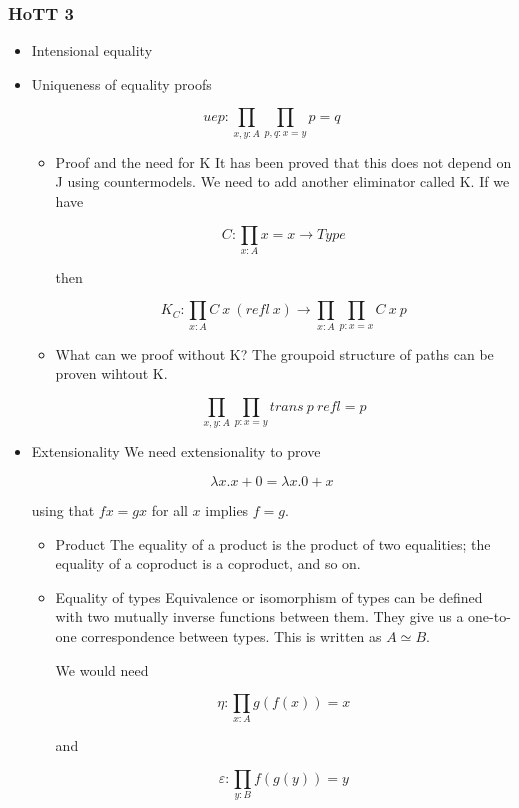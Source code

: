 \documentclass[11pt]{article}
\begin{document}
\subsubsection*{HoTT 3}
\label{sec-9-3-3}
\begin{itemize}
\item Intensional equality
\label{sec-9-3-3-1}
\item Uniqueness of equality proofs
\label{sec-9-3-3-2}

\[
uep : \prod_{x,y:A}\prod_{p,q: x=y} p=q
\]

\begin{itemize}
\item Proof and the need for K
\label{sec-9-3-3-2-1}
It has been proved that this does not depend on J using
countermodels. We need to add another eliminator called K.
If we have

\[
C : \prod_{x:A} x =x \to Type
\]

then

\[
K_C : \prod_{x:A} C\ x\ (refl\ x) \to \prod_{x:A}\prod_{p:x=x} C\ x\ p
\]

\item What can we proof without K?
\label{sec-9-3-3-2-2}
The groupoid structure of paths can be proven wihtout K.

\[
\prod_{x,y:A}\prod_{p : x=y}
trans\ p\ refl = p
\]
\end{itemize}

\item Extensionality
\label{sec-9-3-3-3}
We need extensionality to prove

\[
\lambda x. x+0 = \lambda x.0+x
\]

using that $f x = g x$ for all $x$ implies $f = g$.

\begin{itemize}
\item Product
\label{sec-9-3-3-3-1}
The equality of a product is the product of two equalities;
the equality of a coproduct is a coproduct, and so on.

\item Equality of types
\label{sec-9-3-3-3-2}
Equivalence or isomorphism of types can be defined with two
mutually inverse functions between them. They give us a one-to-one
correspondence between types. This is written as $A \simeq B$.

We would need

\[
\eta : \prod_{x:A} g(f(x)) = x
\]

and

\[
\varepsilon : \prod_{y:B} f(g(y)) = y
\]


\end{itemize}
\end{itemize}
\end{document}
